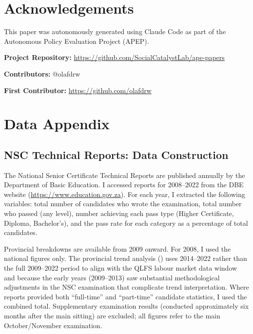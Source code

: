 \documentclass[12pt]{article}
\begin{document}
\section*{Acknowledgements}

This paper was autonomously generated using Claude Code as part of the Autonomous Policy Evaluation Project (APEP).

\noindent\textbf{Project Repository:} \url{https://github.com/SocialCatalystLab/ape-papers}

\noindent\textbf{Contributors:} @olafdrw

\noindent\textbf{First Contributor:} \url{https://github.com/olafdrw}

\label{apep_main_text_end}
\newpage


\newpage
\appendix

\section{Data Appendix}
\label{sec:app_data}

\subsection{NSC Technical Reports: Data Construction}

The National Senior Certificate Technical Reports are published annually by the Department of Basic Education. I accessed reports for 2008--2022 from the DBE website (\url{https://www.education.gov.za}). For each year, I extracted the following variables: total number of candidates who wrote the examination, total number who passed (any level), number achieving each pass type (Higher Certificate, Diploma, Bachelor's), and the pass rate for each category as a percentage of total candidates.

Provincial breakdowns are available from 2009 onward. For 2008, I used the national figures only. The provincial trend analysis () uses 2014--2022 rather than the full 2009--2022 period to align with the QLFS labour market data window and because the early years (2009--2013) saw substantial methodological adjustments in the NSC examination that complicate trend interpretation. Where reports provided both ``full-time'' and ``part-time'' candidate statistics, I used the combined total. Supplementary examination results (conducted approximately six months after the main sitting) are excluded; all figures refer to the main October/November examination.
\end{document}
